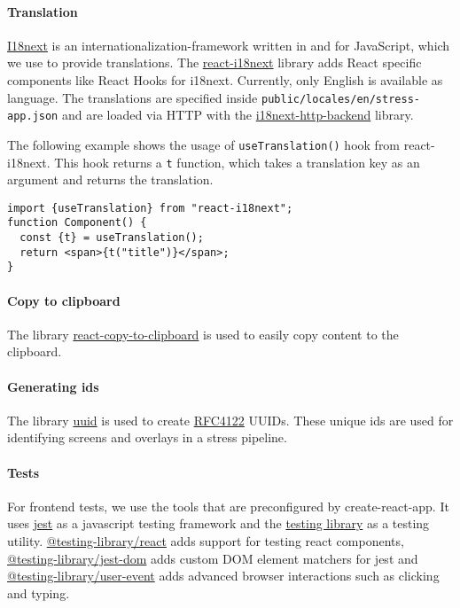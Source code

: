 \paragraph{Translation}
\href{https://www.i18next.com}{I18next} is an internationalization-framework written in and for JavaScript, which we use to provide translations. 
The \href{https://react.i18next.com}{react-i18next} library adds React specific components like React Hooks for i18next. 
Currently, only English is available as language. 
The translations are specified inside \texttt{public/locales/en/stress-app.json} and are loaded via HTTP with the \href{https://github.com/i18next/i18next-http-backend}{i18next-http-backend} library.

The following example shows the usage of \texttt{useTranslation()} hook from react-i18next. 
This hook returns a \texttt{t} function, which takes a translation key as an argument and returns the translation.
\begin{verbatim}
import {useTranslation} from "react-i18next";
function Component() {
  const {t} = useTranslation();
  return <span>{t("title")}</span>;
}
\end{verbatim}

\paragraph{Copy to clipboard}
The library \href{https://github.com/nkbt/react-copy-to-clipboard}{react-copy-to-clipboard} is used to easily copy content to the clipboard.

\paragraph{Generating ids}
The library \href{https://github.com/uuidjs/uuid}{uuid} is used to create \href{https://www.ietf.org/rfc/rfc4122.txt}{RFC4122} UUIDs. 
These unique ids are used for identifying screens and overlays in a stress pipeline.

\paragraph{Tests}
For frontend tests, we use the tools that are preconfigured by create-react-app. 
It uses \href{https://jestjs.io/}{jest} as a javascript testing framework and the \href{https://testing-library.com}{testing library} as a testing utility. 
\href{https://www.npmjs.com/package/@testing-library/react}{@testing-library/react} adds support for testing react components, 
\href{https://www.npmjs.com/package/@testing-library/jest-dom}{@testing-library/jest-dom} adds custom DOM element matchers for jest and 
\href{https://www.npmjs.com/package/@testing-library/user-event}{@testing-library/user-event} adds advanced browser interactions such as clicking and typing.

